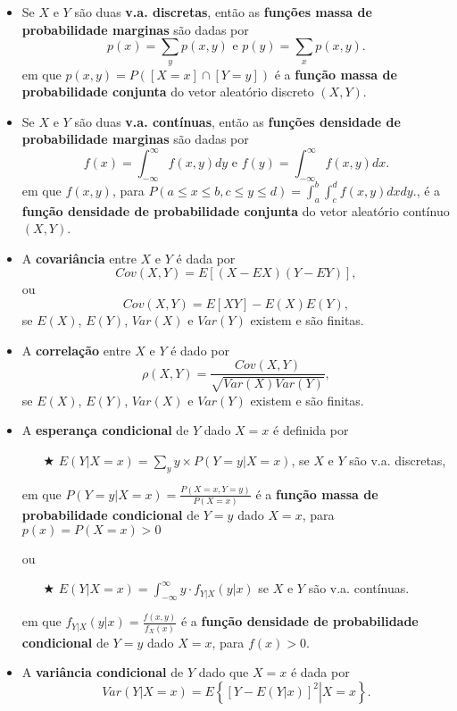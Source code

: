 \documentclass[10pt]{article}%
\begin{document}
\begin{itemize}
    \item Se $X$ e $Y$ são duas {\bf v.a. discretas}, então as {\bf funções massa de probabilidade marginas} são dadas por 
    $$p(x) = \sum_y p(x, y) \text{ e } p(y) = \sum_x p(x, y).$$
    em que $p(x, y) = P([X=x] \cap [Y=y])$ é a {\bf função massa de probabilidade conjunta} do vetor aleatório discreto $(X, Y)$.
    
    \item Se $X$ e $Y$ são duas {\bf v.a. contínuas}, então as {\bf funções densidade de probabilidade marginas} são dadas por 
    $$f(x) = \int_{-\infty}^{\infty} f(x, y) dy \text{ e } f(y) = \int_{-\infty}^{\infty} f(x, y) dx.$$
    em que $f(x, y)$, para $P( a \leq x \leq b, c \leq y \leq d) = \int_a^b \int_c^d f(x,y) dx dy.$, é a {\bf função densidade de probabilidade conjunta} do vetor aleatório contínuo $(X, Y)$.

    \item A {\bf covariância} entre $X$ e $Y$ é dada por 
    $$Cov(X,Y) = E \left[ (X - EX) (Y - EY) \right],$$ 
    ou
    $$Cov(X,Y) = E \left[ X Y \right] - E(X) E(Y),$$
    se $E(X)$, $E(Y)$, $Var(X)$ e $Var(Y)$ existem e são finitas.

    \item A {\bf correlação} entre $X$ e $Y$ é dado por 
    $$\rho(X,Y) = \frac{ Cov(X,Y)}{ \sqrt{Var(X)Var(Y)}},$$ 
    se $E(X)$, $E(Y)$, $Var(X)$ e $Var(Y)$ existem e são finitas.

    \item A {\bf esperança condicional} de $Y$ dado $X=x$ é definida por 
    \begin{itemize}
        \item[$\bigstar$] $E \left( \left. Y \right| X=x \right) = \sum_y y \times P \left( \left. Y=y \right| X=x \right)$, se $X$ e $Y$ são v.a. discretas,
    \end{itemize}
    em que $P \left( \left. Y=y \right| X=x \right) = \frac{P(X=x,Y=y)}{P \left( X=x\right)}$ é a {\bf função massa de probabilidade condicional} de $Y=y$ dado $X=x$, para $p(x) = P(X=x)>0$
    
    ou

    \begin{itemize}
        \item[$\bigstar$] $E\left( \left. Y \right| X=x \right) = \int_{-\infty}^{\infty} y \cdot f_{ \left. Y \right| X} \left( \left. y \right| x \right)$ se $X$ e $Y$ são v.a. contínuas.
    \end{itemize}
    em que $f_{ \left.Y \right| X} \left( \left. y \right| x \right) = \frac{f(x,y)}{f_X \left( x \right)}$ é a {\bf função densidade de probabilidade condicional} de $Y=y$ dado $X=x$, para $f(x) > 0$.

\item A {\bf variância condicional} de $Y$ dado que $X=x$ é dada por
$$ Var \left( \left. Y \right| X=x \right) = E \left\{ \left[ Y - E \left(  \left. Y \right| x \right) \right]^2 \left. \right| X=x  \right\}.$$
\end{itemize}
\end{document}
